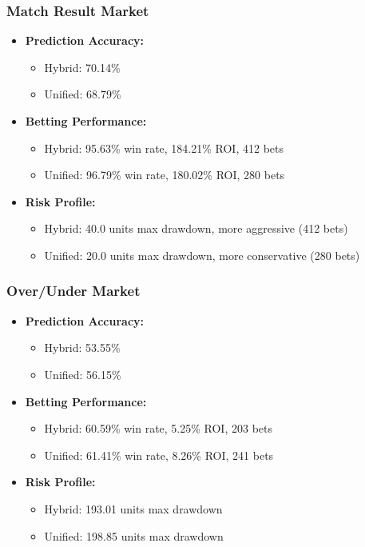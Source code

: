 \documentclass[conference]{IEEEtran}
\begin{document}
\subsubsection{Match Result Market}
\begin{itemize}
\item \textbf{Prediction Accuracy:}
    \begin{itemize}
    \item Hybrid: 70.14\%
    \item Unified: 68.79\%
    \end{itemize}
\item \textbf{Betting Performance:}
    \begin{itemize}
    \item Hybrid: 95.63\% win rate, 184.21\% ROI, 412 bets
    \item Unified: 96.79\% win rate, 180.02\% ROI, 280 bets
    \end{itemize}
\item \textbf{Risk Profile:}
    \begin{itemize}
    \item Hybrid: 40.0 units max drawdown, more aggressive (412 bets)
    \item Unified: 20.0 units max drawdown, more conservative (280 bets)
    \end{itemize}
\end{itemize}

\subsubsection{Over/Under Market}
\begin{itemize}
\item \textbf{Prediction Accuracy:}
    \begin{itemize}
    \item Hybrid: 53.55\%
    \item Unified: 56.15\%
    \end{itemize}
\item \textbf{Betting Performance:}
    \begin{itemize}
    \item Hybrid: 60.59\% win rate, 5.25\% ROI, 203 bets
    \item Unified: 61.41\% win rate, 8.26\% ROI, 241 bets
    \end{itemize}
\item \textbf{Risk Profile:}
    \begin{itemize}
    \item Hybrid: 193.01 units max drawdown
    \item Unified: 198.85 units max drawdown
    \end{itemize}
\end{itemize}
\end{document}
